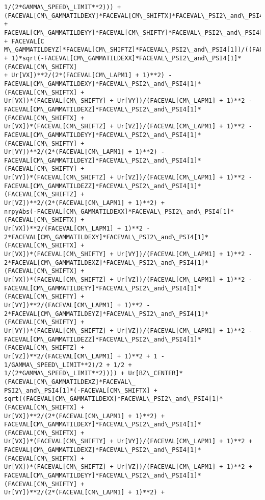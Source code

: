 \documentclass[landscape,letterpaper,10pt,english]{article}
\begin{document}
\begin{Verbatim}[commandchars=\\\{\}]
1/(2*GAMMA\_SPEED\_LIMIT**2))) +
(FACEVAL[CM\_GAMMATILDEXY]*FACEVAL[CM\_SHIFTX]*FACEVAL\_PSI2\_and\_PSI4[1] +
FACEVAL[CM\_GAMMATILDEYY]*FACEVAL[CM\_SHIFTY]*FACEVAL\_PSI2\_and\_PSI4[1] + FACEVAL[C
M\_GAMMATILDEYZ]*FACEVAL[CM\_SHIFTZ]*FACEVAL\_PSI2\_and\_PSI4[1])/((FACEVAL[CM\_LAPM1]
+ 1)*sqrt(-FACEVAL[CM\_GAMMATILDEXX]*FACEVAL\_PSI2\_and\_PSI4[1]*(FACEVAL[CM\_SHIFTX]
+ Ur[VX])**2/(2*(FACEVAL[CM\_LAPM1] + 1)**2) -
FACEVAL[CM\_GAMMATILDEXY]*FACEVAL\_PSI2\_and\_PSI4[1]*(FACEVAL[CM\_SHIFTX] +
Ur[VX])*(FACEVAL[CM\_SHIFTY] + Ur[VY])/(FACEVAL[CM\_LAPM1] + 1)**2 -
FACEVAL[CM\_GAMMATILDEXZ]*FACEVAL\_PSI2\_and\_PSI4[1]*(FACEVAL[CM\_SHIFTX] +
Ur[VX])*(FACEVAL[CM\_SHIFTZ] + Ur[VZ])/(FACEVAL[CM\_LAPM1] + 1)**2 -
FACEVAL[CM\_GAMMATILDEYY]*FACEVAL\_PSI2\_and\_PSI4[1]*(FACEVAL[CM\_SHIFTY] +
Ur[VY])**2/(2*(FACEVAL[CM\_LAPM1] + 1)**2) -
FACEVAL[CM\_GAMMATILDEYZ]*FACEVAL\_PSI2\_and\_PSI4[1]*(FACEVAL[CM\_SHIFTY] +
Ur[VY])*(FACEVAL[CM\_SHIFTZ] + Ur[VZ])/(FACEVAL[CM\_LAPM1] + 1)**2 -
FACEVAL[CM\_GAMMATILDEZZ]*FACEVAL\_PSI2\_and\_PSI4[1]*(FACEVAL[CM\_SHIFTZ] +
Ur[VZ])**2/(2*(FACEVAL[CM\_LAPM1] + 1)**2) +
nrpyAbs(-FACEVAL[CM\_GAMMATILDEXX]*FACEVAL\_PSI2\_and\_PSI4[1]*(FACEVAL[CM\_SHIFTX] +
Ur[VX])**2/(FACEVAL[CM\_LAPM1] + 1)**2 -
2*FACEVAL[CM\_GAMMATILDEXY]*FACEVAL\_PSI2\_and\_PSI4[1]*(FACEVAL[CM\_SHIFTX] +
Ur[VX])*(FACEVAL[CM\_SHIFTY] + Ur[VY])/(FACEVAL[CM\_LAPM1] + 1)**2 -
2*FACEVAL[CM\_GAMMATILDEXZ]*FACEVAL\_PSI2\_and\_PSI4[1]*(FACEVAL[CM\_SHIFTX] +
Ur[VX])*(FACEVAL[CM\_SHIFTZ] + Ur[VZ])/(FACEVAL[CM\_LAPM1] + 1)**2 -
FACEVAL[CM\_GAMMATILDEYY]*FACEVAL\_PSI2\_and\_PSI4[1]*(FACEVAL[CM\_SHIFTY] +
Ur[VY])**2/(FACEVAL[CM\_LAPM1] + 1)**2 -
2*FACEVAL[CM\_GAMMATILDEYZ]*FACEVAL\_PSI2\_and\_PSI4[1]*(FACEVAL[CM\_SHIFTY] +
Ur[VY])*(FACEVAL[CM\_SHIFTZ] + Ur[VZ])/(FACEVAL[CM\_LAPM1] + 1)**2 -
FACEVAL[CM\_GAMMATILDEZZ]*FACEVAL\_PSI2\_and\_PSI4[1]*(FACEVAL[CM\_SHIFTZ] +
Ur[VZ])**2/(FACEVAL[CM\_LAPM1] + 1)**2 + 1 - 1/GAMMA\_SPEED\_LIMIT**2)/2 + 1/2 +
1/(2*GAMMA\_SPEED\_LIMIT**2)))) + Ur[BZ\_CENTER]*(FACEVAL[CM\_GAMMATILDEXZ]*FACEVAL\_
PSI2\_and\_PSI4[1]*(-FACEVAL[CM\_SHIFTX] +
sqrt((FACEVAL[CM\_GAMMATILDEXX]*FACEVAL\_PSI2\_and\_PSI4[1]*(FACEVAL[CM\_SHIFTX] +
Ur[VX])**2/(2*(FACEVAL[CM\_LAPM1] + 1)**2) +
FACEVAL[CM\_GAMMATILDEXY]*FACEVAL\_PSI2\_and\_PSI4[1]*(FACEVAL[CM\_SHIFTX] +
Ur[VX])*(FACEVAL[CM\_SHIFTY] + Ur[VY])/(FACEVAL[CM\_LAPM1] + 1)**2 +
FACEVAL[CM\_GAMMATILDEXZ]*FACEVAL\_PSI2\_and\_PSI4[1]*(FACEVAL[CM\_SHIFTX] +
Ur[VX])*(FACEVAL[CM\_SHIFTZ] + Ur[VZ])/(FACEVAL[CM\_LAPM1] + 1)**2 +
FACEVAL[CM\_GAMMATILDEYY]*FACEVAL\_PSI2\_and\_PSI4[1]*(FACEVAL[CM\_SHIFTY] +
Ur[VY])**2/(2*(FACEVAL[CM\_LAPM1] + 1)**2) +

\end{Verbatim}
\end{document}
